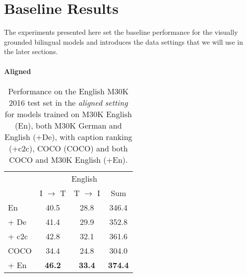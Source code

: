 \section{Baseline Results}\label{sec:results}

The experiments presented here set the baseline performance 
for the visually grounded bilingual models
and introduces the data settings that we will use in the 
later sections.

\paragraph{Aligned}

\begin{table}[t]
    \centering
    \renewcommand{\arraystretch}{1.0}
    \begin{tabular}{lccc}
        \toprule
         & \multicolumn{3}{c}{English}\\
         \cmidrule(lr){2-4}
         & I $\rightarrow$ T & T $\rightarrow$ I & Sum\\
         \midrule
         En & 40.5 & 28.8 & 346.4 \\
         \; + De & 41.4 & 29.9  & 352.8\\
         \; \; + c2c & 42.8  & 32.1 & 361.6\\
         \hdashline
         COCO & 34.4 & 24.8 & 304.0 \\
         \; + En & \textbf{46.2} & \textbf{33.4} & \textbf{374.4}\\
         \bottomrule
    \end{tabular}
    \caption{Performance on the English
    M30K 2016 test set in the \emph{aligned setting} for models trained on 
    M30K English (En), both M30K German and English 
    (+De), with caption ranking (+c2c), 
    COCO (COCO) and both COCO and M30K English (+En).}
    \label{tab:engbaseline}
\end{table}



